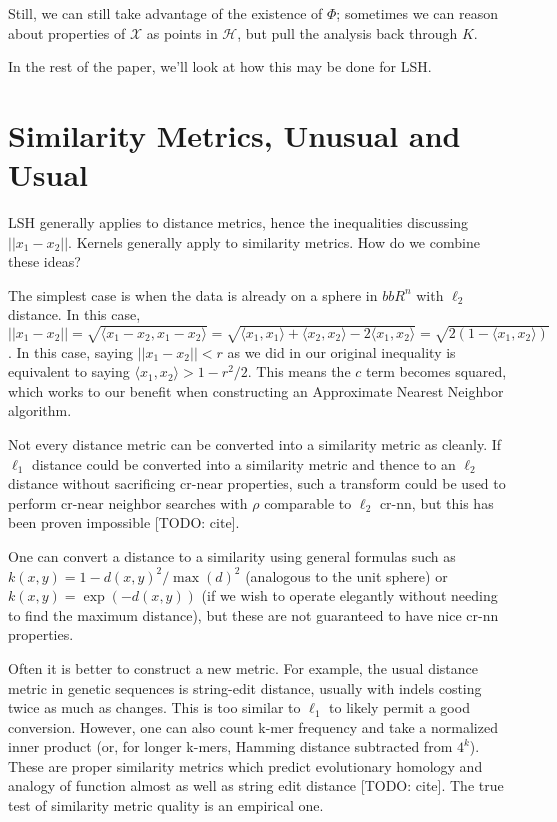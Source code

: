 \documentclass[twoside,11pt]{homework}
\begin{document}
\begin{multicols}{2}
Still, we can still take advantage of the existence of $\Phi$; sometimes we can reason about properties of $\mathcal{X}$ as points in $\mathcal{H}$, but pull the analysis back through $K$.

In the rest of the paper, we'll look at how this may be done for LSH.

\section{Similarity Metrics, Unusual and Usual} %
  
LSH generally applies to distance metrics, hence the inequalities
discussing $||x_1-x_2||$.  Kernels generally apply to similarity
metrics.  How do we combine these ideas?

The simplest case is when the data is already on a sphere in $bbR^n$
with $\ell_2$ distance.  In this case, $||x_1-x_2||=\sqrt{\langle
  x_1-x_2, x_1-x_2 \rangle}=\sqrt{\langle x_1,x_1 \rangle+\langle
  x_2,x_2 \rangle - 2 \langle x_1,x_2 \rangle} = \sqrt{2(1-\langle
  x_1,x_2 \rangle)}$.  In this case, saying $||x_1-x_2||<r$ as we did
in our original inequality is equivalent to saying $\langle x_1,x_2
\rangle > 1-r^2/2$.  This means the $c$ term becomes squared, which
works to our benefit when constructing an Approximate Nearest Neighbor
algorithm.

Not every distance metric can be converted into a similarity metric as
cleanly.  If $\ell_1$ distance could be converted into a similarity
metric and thence to an $\ell_2$ distance without sacrificing cr-near
properties, such a transform could be used to perform cr-near neighbor
searches with $\rho$ comparable to $\ell_2$ cr-nn, but this has been
proven impossible [TODO: cite].

One can convert a distance to a similarity using general formulas such
as $k(x,y)=1-d(x,y)^2/\max(d)^2$ (analogous to the unit sphere) or
$k(x,y)=\exp(-d(x,y))$ (if we wish to operate elegantly without
needing to find the maximum distance), but these are not guaranteed to
have nice cr-nn properties.

Often it is better to construct a new metric.  For example, the usual
distance metric in genetic sequences is string-edit distance, usually
with indels costing twice as much as changes.  This is too similar to
$\ell_1$ to likely permit a good conversion.  However, one can also
count k-mer frequency and take a normalized inner product (or, for
longer k-mers, Hamming distance subtracted from $4^k$).  These are
proper similarity metrics which predict evolutionary homology and
analogy of function almost as well as string edit distance [TODO:
  cite].  The true test of similarity metric quality is an empirical
one.


\end{multicols}
\end{document}
